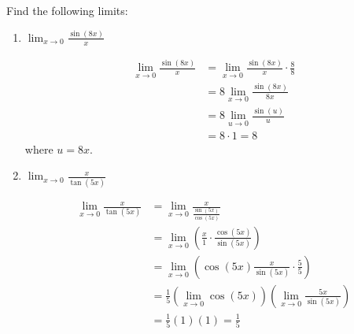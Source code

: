 \documentclass[nooutcomes,handout]{ximera}
\begin{document}
\begin{problem}
Find the following limits:

	\begin{enumerate}
	
	\item  $\lim_{x \to 0} \frac{\sin(8x)}{x}$
			\begin{freeResponse}
			\begin{align*}
			\lim_{x \to 0} \frac{\sin(8x)}{x} &= \lim_{x \to 0} \frac{\sin(8x)}{x} \cdot \frac{8}{8}  \\
			&= 8 \lim_{x \to 0} \frac{\sin(8x)}{8x}  \\
			&= 8 \lim_{u \to 0} \frac{\sin(u)}{u}  \\
			&= 8 \cdot 1 = 8
			\end{align*}
			where $u = 8x$.  
			\end{freeResponse}
			
	
	\item  $\lim_{x \to 0} \frac{x}{\tan(5x)}$
			\begin{freeResponse}
			\begin{align*}
			\lim_{x \to 0} \frac{x}{\tan(5x)} &= \lim_{x \to 0} \frac{x}{\frac{\sin(5x)}{\cos(5x)}}  \\
			&= \lim_{x \to 0} \left( \frac{x}{1} \cdot \frac{\cos(5x)}{\sin(5x)} \right)  \\
			&= \lim_{x \to 0} \left( \cos(5x) \frac{x}{\sin(5x)} \cdot \frac{5}{5} \right)  \\
			&= \frac{1}{5} \left( \lim_{x \to 0} \cos(5x) \right) \left( \lim_{x \to 0} \frac{5x}{\sin(5x)} \right)  \\
			&= \frac{1}{5} (1) (1) = \frac{1}{5}
			\end{align*}
			\end{freeResponse}
			
			
			
	\end{enumerate}
\end{problem}
	
\end{document}
